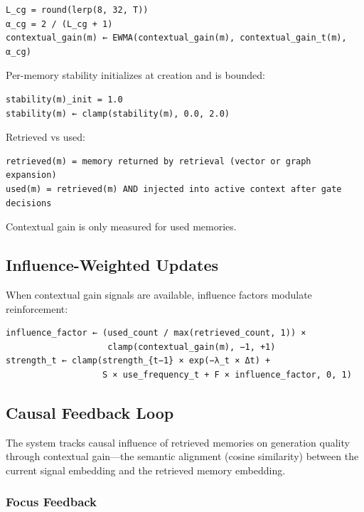 \documentclass[
  letterpaper,
  DIV=11,
  numbers=noendperiod]{scrartcl}
\begin{document}
\begin{verbatim}
L_cg = round(lerp(8, 32, T))
α_cg = 2 / (L_cg + 1)
contextual_gain(m) ← EWMA(contextual_gain(m), contextual_gain_t(m), α_cg)
\end{verbatim}

Per-memory stability initializes at creation and is bounded:

\begin{verbatim}
stability(m)_init = 1.0
stability(m) ← clamp(stability(m), 0.0, 2.0)
\end{verbatim}

Retrieved vs used:

\begin{verbatim}
retrieved(m) = memory returned by retrieval (vector or graph expansion)
used(m) = retrieved(m) AND injected into active context after gate decisions
\end{verbatim}

Contextual gain is only measured for used memories.

\subsection{Influence-Weighted
Updates}\label{influence-weighted-updates}

When contextual gain signals are available, influence factors modulate
reinforcement:

\begin{verbatim}
influence_factor ← (used_count / max(retrieved_count, 1)) ×
                    clamp(contextual_gain(m), −1, +1)
strength_t ← clamp(strength_{t−1} × exp(−λ_t × Δt) +
                   S × use_frequency_t + F × influence_factor, 0, 1)
\end{verbatim}

\subsection{Causal Feedback Loop}\label{sec-feedback}

The system tracks causal influence of retrieved memories on generation
quality through contextual gain---the semantic alignment (cosine
similarity) between the current signal embedding and the retrieved
memory embedding.

\subsubsection{Focus Feedback}\label{focus-feedback}
\end{document}
